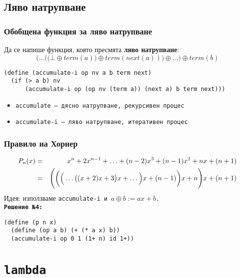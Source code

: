\documentclass{beamer}
\begin{document}
\subsection{Ляво натрупване}

\begin{frame}[fragile]
  \frametitle{Обобщена функция за ляво натрупване}

  Да се напише функция, която пресмята \textbf{ляво натрупване}:
  \begin{equation*}
    \bigg(\ldots\Big(\big(\bot \oplus term(a)\big) \oplus term(next(a))\Big) \oplus \ldots\bigg) \oplus term(b)
  \end{equation*}
  \pause
  \small
\begin{lstlisting}
(define (accumulate-i op nv a b term next)
  (if (> a b) nv
      (accumulate-i op (op nv (term a)) (next a) b term next)))
\end{lstlisting}
  \pause
  \begin{itemize}
  \item \tt{accumulate} --- дясно натрупване, рекурсивен процес
  \item \tt{accumulate-i} --- ляво натрупване, итеративен процес
  \end{itemize}
\end{frame}

\begin{frame}[fragile]
  \frametitle{Правило на Хорнер}

  \begin{eqnarray*}
    P_n(x) &=& x^n + 2x^{n-1} + \ldots + (n-2)x^3 + (n-1)x^2 + nx + (n+1)\\
    &=& \Bigg(\bigg(\Big(\ldots\big((x + 2)x + 3\big)x + \ldots\Big)x + (n-1)\bigg)x + n\Bigg)x + (n+1)
  \end{eqnarray*}
  Идея: използваме \tt{accumulate-i} и $a \oplus b := ax + b$.\\[1em]
  \pause
  \textbf{Решение №4:}
\begin{lstlisting}
(define (p n x)
  (define (op a b) (+ (* a x) b))
  (accumulate-i op 0 1 (1+ n) id 1+))
\end{lstlisting}
\end{frame}

\section{\tt{lambda}}
\end{document}
